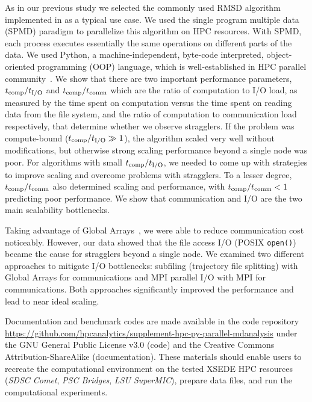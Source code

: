 As in our previous study we selected the commonly used RMSD algorithm implemented in  as a typical use case.
We used the single program multiple data (SPMD) paradigm to parallelize this algorithm on HPC resources.
With SPMD, each process executes essentially the same operations on different parts of the data. 
We used Python, a machine-independent, byte-code interpreted, object-oriented programming (OOP) language, which is well-established in HPC parallel community~\cite{GAiN}. 
We show that there are two important performance parameters, ${t}_{\text{comp}}/{t}_{\text{I/O}}$ and ${t}_{\text{comp}}/t_{\text{comm}}$ which are the ratio of computation to I/O load, as measured by the time spent on computation versus the time spent on reading data from the file system, and the ratio of computation to communication load respectively, that determine whether we observe stragglers.
If the problem was compute-bound (${t}_{\text{comp}}/{t}_{\text{I/O}} \gg 1$), the algorithm scaled very well without modifications, but otherwise strong scaling performance beyond a single node was poor.  
For algorithms with small ${t}_{\text{comp}}/{t}_{\text{I/O}}$, we needed to come up with strategies to improve scaling and overcome problems with stragglers.
To a lesser degree, ${t}_{\text{comp}}/t_{\text{comm}}$ also determined scaling and performance, with ${t}_{\text{comp}}/t_{\text{comm}} < 1$ predicting poor performance.
We show that communication and I/O are the two main scalability bottlenecks.

Taking advantage of Global Arrays~\cite{GA, GAiN}, we were able to reduce communication cost noticeably.
However, our data showed that the file access I/O (POSIX \texttt{open()}) became the cause for stragglers beyond a single node.
We examined two different approaches to mitigate I/O bottlenecks: subfiling (trajectory file splitting) with Global Arrays for communications and MPI parallel I/O with MPI for communications.
Both approaches significantly improved the performance and lead to near ideal scaling.

Documentation and benchmark codes are made available in the code repository \url{https://github.com/hpcanalytics/supplement-hpc-py-parallel-mdanalysis} under the GNU General Public License v3.0 (code) and the Creative Commons Attribution-ShareAlike (documentation). 
These materials should enable users to recreate the computational environment on the tested XSEDE HPC resources (\emph{SDSC Comet}, \emph{PSC Bridges}, \emph{LSU SuperMIC}), prepare data files, and run the computational experiments.